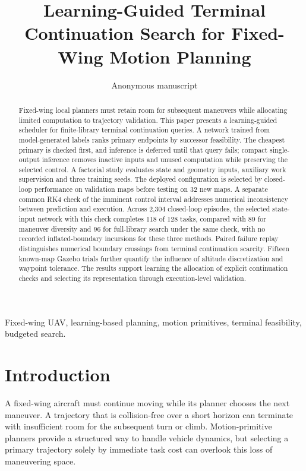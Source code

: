 \documentclass[journal]{IEEEtran}
\title{Learning-Guided Terminal Continuation Search for Fixed-Wing Motion Planning}
\author{Anonymous manuscript}
\begin{document}
\maketitle
\begin{abstract}
Fixed-wing local planners must retain room for subsequent maneuvers while allocating limited computation to trajectory validation. This paper presents a learning-guided scheduler for finite-library terminal continuation queries. A network trained from model-generated labels ranks primary endpoints by successor feasibility. The cheapest primary is checked first, and inference is deferred until that query fails; compact single-output inference removes inactive inputs and unused computation while preserving the selected control. A factorial study evaluates state and geometry inputs, auxiliary work supervision and three training seeds. The deployed configuration is selected by closed-loop performance on validation maps before testing on 32 new maps. A separate common RK4 check of the imminent control interval addresses numerical inconsistency between prediction and execution. Across 2,304 closed-loop episodes, the selected state-input network with this check completes 118 of 128 tasks, compared with 89 for maneuver diversity and 96 for full-library search under the same check, with no recorded inflated-boundary incursions for these three methods. Paired failure replay distinguishes numerical boundary crossings from terminal continuation scarcity. Fifteen known-map Gazebo trials further quantify the influence of altitude discretization and waypoint tolerance. The results support learning the allocation of explicit continuation checks and selecting its representation through execution-level validation.
\end{abstract}
\begin{IEEEkeywords}Fixed-wing UAV, learning-based planning, motion primitives, terminal feasibility, budgeted search.\end{IEEEkeywords}
\section{Introduction}
A fixed-wing aircraft must continue moving while its planner chooses the next maneuver. A trajectory that is collision-free over a short horizon can terminate with insufficient room for the subsequent turn or climb. Motion-primitive planners provide a structured way to handle vehicle dynamics, but selecting a primary trajectory solely by immediate task cost can overlook this loss of maneuvering space.
\end{document}
